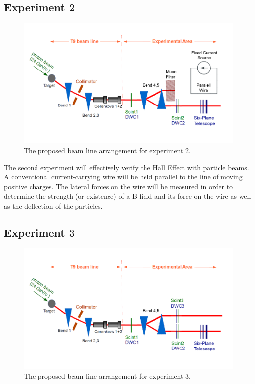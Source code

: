 \documentclass[12pt,letterpaper]{article}
\begin{document}
\subsection{Experiment 2}
\begin{figure}[H]
\label{experiment_setup2}
  \centering
\includegraphics[]{experimental_setup2.png}
 \caption{The proposed beam line arrangement for experiment 2.}
\end{figure}
The second experiment will effectively verify the Hall Effect with particle beams.
A conventional current-carrying wire will be held parallel to the line of moving positive charges. The lateral forces on the wire will be measured in order to determine the strength (or existence) of a B-field and its force on the wire as well as the deflection of the particles.

\subsection{Experiment 3}
\begin{figure}[H]
\label{experiment_setup3}
  \centering
\includegraphics[]{experimental_setup3.png}
 \caption{The proposed beam line arrangement for experiment 3.}
\end{figure}
\end{document}
